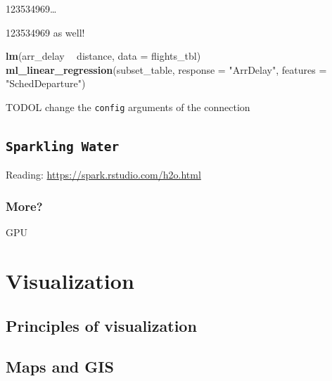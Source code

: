 \documentclass[]{book}
\newenvironment{Shaded}{\begin{snugshade}}{\end{snugshade}}
\newcommand{\KeywordTok}[1]{\textcolor[rgb]{0.13,0.29,0.53}{\textbf{#1}}}
\newcommand{\DataTypeTok}[1]{\textcolor[rgb]{0.13,0.29,0.53}{#1}}
\newcommand{\StringTok}[1]{\textcolor[rgb]{0.31,0.60,0.02}{#1}}
\newcommand{\CommentTok}[1]{\textcolor[rgb]{0.56,0.35,0.01}{\textit{#1}}}
\newcommand{\OperatorTok}[1]{\textcolor[rgb]{0.81,0.36,0.00}{\textbf{#1}}}
\newcommand{\NormalTok}[1]{#1}
\theoremstyle{definition}
\theoremstyle{definition}
\theoremstyle{definition}
\theoremstyle{remark}
\begin{document}
123534969\ldots{}

\begin{Shaded}
\end{Shaded}

\begin{Shaded}
\end{Shaded}

123534969 as well!

\begin{Shaded}
\begin{Highlighting}[]
\KeywordTok{lm}\NormalTok{(arr_delay }\OperatorTok{~}\StringTok{ }\NormalTok{distance, }\DataTypeTok{data =}\NormalTok{ flights_tbl)}
\KeywordTok{ml_linear_regression}\NormalTok{(subset_table, }\DataTypeTok{response =} \StringTok{"ArrDelay"}\NormalTok{, }\DataTypeTok{features =} \StringTok{"SchedDeparture"}\NormalTok{)}
\end{Highlighting}
\end{Shaded}

TODOL change the \texttt{config} arguments of the connection

\section{\texorpdfstring{\texttt{Sparkling\ Water}}{Sparkling Water}}\label{sparkling-water}

Reading: \url{https://spark.rstudio.com/h2o.html}

\subsection{More?}\label{more}

GPU

\chapter{Visualization}\label{visualization}

\section{Principles of visualization}\label{principles-of-visualization}

\section{Maps and GIS}\label{maps-and-gis}


\end{document}
